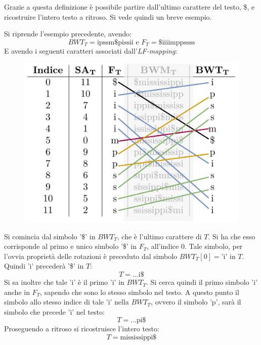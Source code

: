 Grazie a questa definizione è possibile partire dall'ultimo carattere del testo,
\$, e ricostruire l'intero testo a ritroso. Si vede quindi un breve esempio.
\begin{esempio}
  Si riprende l'esempio precedente, avendo:
  \[BWT_T=\mbox{ipssm\$pissii}\mbox{ e }F_T=\mbox{\$iiiimppssss}\]
  E avendo i seguenti caratteri associati dall'\textit{LF-mapping}:
  \begin{figure}[H]
    \centering
    \includegraphics[scale = 0.33]{img/lf.pdf}
  \end{figure}
  Si comincia dal simbolo '\$' in $BWT_T$, che è l'ultimo carattere di $T$. Si
  ha che esso corrisponde al primo e unico simbolo '\$' in $F_T$, all'indice
  $0$. Tale simbolo, per l'ovvia proprietà delle rotazioni è preceduto dal
  simbolo $BWT_T[0]=\mbox{'i'}$ in $T$. Quindi $\mbox{'i'}$ precederà '\$' in
  $T$:
  \[T=\ldots\mbox{i\$}\]
  Si sa inoltre che
  tale $\mbox{'i'}$ è il primo $\mbox{'i'}$ in $BWT_T$. Si cerca quindi il primo
  simbolo $\mbox{'i'}$ anche in $F_T$,
  sapendo che sono lo stesso simbolo nel testo. A questo punto il simbolo allo
  stesso indice di tale $\mbox{'i'}$ nella $BWT_T$, ovvero il simbolo
  $\mbox{'p'}$, sarà il simbolo che precede $\mbox{'i'}$ nel testo:
  \[T=\ldots\mbox{pi\$}\]
  Proseguendo a ritroso si ricostruisce l'intero testo:
  \[T=\mbox{mississippi\$}\]
\end{esempio}
